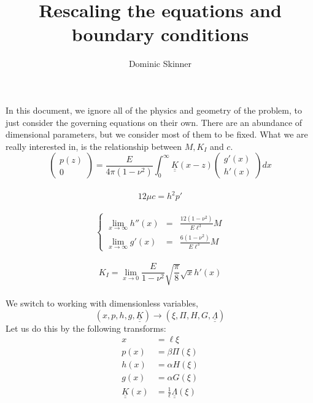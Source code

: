 \documentclass{article}
\begin{document}
\title{Rescaling the equations and boundary conditions}
\author{Dominic Skinner}
\maketitle
In this document, we ignore all of the physics and geometry of the problem,
to just consider the governing equations on their own. There are an abundance
of dimensional parameters, but we consider most of them to be fixed. 
What we are really interested in, is the relationship
between $M,K_I$ and $c$.
\\
\begin{equation}
 \left( \begin{array}{c} p(z) \\ 0 \end{array} \right) =
\frac{E}{4\pi (1-\nu^2)} \int_0^{\infty} 
\underline{\underline{K}}(x-z) 
\left( \begin{array}{c} g'(x) \\ h'(x) \end{array} \right) dx
\end{equation}
\\
\begin{equation}
12\mu c = h^2 p'
\end{equation}
\\
\begin{equation}
\left\{ \begin{array}{ccc}
\displaystyle \lim_{x\to\infty} h''(x) & = & \frac{12(1-\nu^2)}{E\ell^3} M \\
\displaystyle \lim_{x\to\infty} g'(x) & = & \frac{6(1-\nu^2)}{E\ell^3} M 
\end{array} \right.
\end{equation}
\\
\begin{equation}
K_I = \lim_{x\to 0} \frac{E}{1-\nu^2} \sqrt{\frac{\pi}{8}} \sqrt{x} h'(x)
\end{equation}
\\
We switch to working with dimensionless variables, 
\[ (x,p,h,g,\underline{\underline{K}}) \to (\xi, \Pi, H, G, 
\underline{\underline{\Lambda}} )\]
Let us do this by the following transforms:
\begin{align*}
x &= \ell \xi \\
p(x) &= \beta \Pi (\xi) \\
h(x) &= \alpha H(\xi) \\
g(x) &= \alpha G(\xi) \\
\underline{\underline{K}}(x) &= \frac{1}{\ell} 
\underline{\underline{\Lambda}}(\xi) \end{align*}
\end{document}
